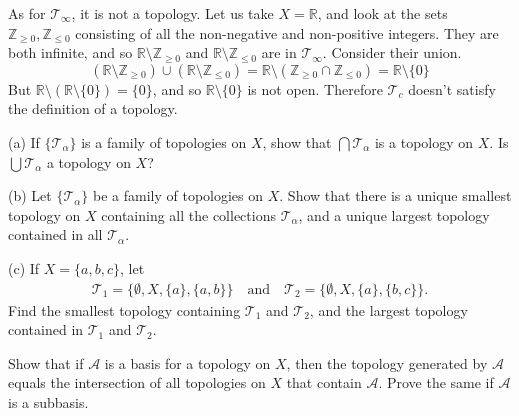 \begin{solution}[Munkres 13.3]
    As for $\mathcal{T}_\infty$, it is not a topology. Let us take $X = \mathbb{R}$, and look at the sets $\mathbb{Z}_{\geq 0}, \mathbb{Z}_{\leq 0}$ consisting of all the non-negative and non-positive integers. They are both infinite, and so $\mathbb{R} \setminus \mathbb{Z}_{\geq 0}$ and $\mathbb{R} \setminus \mathbb{Z}_{\leq 0}$ are in $\mathcal{T}_\infty$. Consider their union. 
    \begin{equation}
      (\mathbb{R} \setminus \mathbb{Z}_{\geq 0}) \cup (\mathbb{R} \setminus \mathbb{Z}_{\leq 0}) = \mathbb{R} \setminus (\mathbb{Z}_{\geq 0} \cap \mathbb{Z}_{\leq 0}) = \mathbb{R} \setminus \{0\}
    \end{equation}
    But $\mathbb{R} \setminus (\mathbb{R} \setminus \{0\}) = \{0\}$, and so $\mathbb{R} \setminus \{0\}$ is not open. Therefore $\mathcal{T}_c$ doesn't satisfy the definition of a topology. 
  \end{solution}

  \begin{exercise}[Munkres 13.4]
    (a) If $\{\mathcal{T}_\alpha\}$ is a family of topologies on $X$, show that $\bigcap \mathcal{T}_\alpha$ is a topology on $X$. Is $\bigcup \mathcal{T}_\alpha$ a topology on $X$?
    
    (b) Let $\{\mathcal{T}_\alpha\}$ be a family of topologies on $X$. Show that there is a unique smallest topology on $X$ containing all the collections $\mathcal{T}_\alpha$, and a unique largest topology contained in all $\mathcal{T}_\alpha$.
    
    (c) If $X = \{a, b, c\}$, let
    \begin{align*}
      \mathcal{T}_1 = \{\emptyset, X, \{a\}, \{a, b\}\} \quad \text{and} \quad \mathcal{T}_2 = \{\emptyset, X, \{a\}, \{b, c\}\}.
    \end{align*}
    Find the smallest topology containing $\mathcal{T}_1$ and $\mathcal{T}_2$, and the largest topology contained in $\mathcal{T}_1$ and $\mathcal{T}_2$.
  \end{exercise}
  \begin{solution}
    
  \end{solution}

  \begin{exercise}[Munkres 13.5]
    Show that if $\mathcal{A}$ is a basis for a topology on $X$, then the topology generated by $\mathcal{A}$ equals the intersection of all topologies on $X$ that contain $\mathcal{A}$. Prove the same if $\mathcal{A}$ is a subbasis.
  \end{exercise}
  \begin{solution}
    
  \end{solution}

